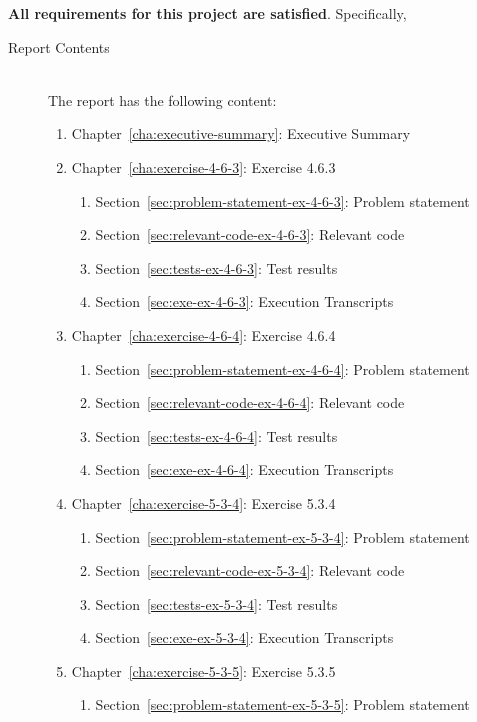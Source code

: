 \documentclass{report}
\begin{document}
\textbf{All requirements for this project are satisfied}.
Specifically,
\begin{description}
\item[Report Contents] \ \\
  The report has the following content:
  \begin{enumerate}[{}]
  \item Chapter~\ref{cha:executive-summary}: Executive Summary
  \item Chapter~\ref{cha:exercise-4-6-3}: Exercise 4.6.3
    \begin{enumerate}[{}]
    \item Section~\ref{sec:problem-statement-ex-4-6-3}: Problem statement
    \item Section~\ref{sec:relevant-code-ex-4-6-3}: Relevant code
    \item Section~\ref{sec:tests-ex-4-6-3}: Test results
    \item Section~\ref{sec:exe-ex-4-6-3}: Execution Transcripts
    \end{enumerate}
  \item Chapter~\ref{cha:exercise-4-6-4}: Exercise 4.6.4
    \begin{enumerate}[{}]
    \item Section~\ref{sec:problem-statement-ex-4-6-4}: Problem statement
    \item Section~\ref{sec:relevant-code-ex-4-6-4}: Relevant code
    \item Section~\ref{sec:tests-ex-4-6-4}: Test results
    \item Section~\ref{sec:exe-ex-4-6-4}: Execution Transcripts
    \end{enumerate}
  \item Chapter~\ref{cha:exercise-5-3-4}: Exercise 5.3.4
    \begin{enumerate}[{}]
    \item Section~\ref{sec:problem-statement-ex-5-3-4}: Problem statement
    \item Section~\ref{sec:relevant-code-ex-5-3-4}: Relevant code
    \item Section~\ref{sec:tests-ex-5-3-4}: Test results
    \item Section~\ref{sec:exe-ex-5-3-4}: Execution Transcripts
    \end{enumerate}
  \item Chapter~\ref{cha:exercise-5-3-5}: Exercise 5.3.5
    \begin{enumerate}[{}]
    \item Section~\ref{sec:problem-statement-ex-5-3-5}: Problem statement

\end{enumerate}
\end{enumerate}
\end{description}
\end{document}
